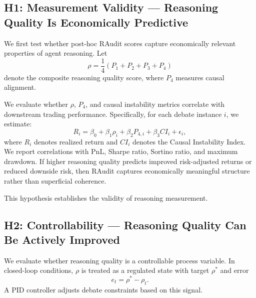 \documentclass{article}
\begin{document}
\subsection{H1: Measurement Validity — Reasoning Quality Is Economically Predictive}

We first test whether post-hoc RAudit scores capture economically relevant properties of agent reasoning. Let
\begin{equation}
\rho = \frac{1}{4}(P_1 + P_2 + P_3 + P_4)
\end{equation}
denote the composite reasoning quality score, where $P_4$ measures causal alignment.

We evaluate whether $\rho$, $P_4$, and causal instability metrics correlate with downstream trading performance. Specifically, for each debate instance $i$, we estimate:
\begin{equation}
R_i = \beta_0 + \beta_1 \rho_i + \beta_2 P_{4,i} + \beta_3 CI_i + \epsilon_i,
\end{equation}
where $R_i$ denotes realized return and $CI_i$ denotes the Causal Instability Index. We report correlations with PnL, Sharpe ratio, Sortino ratio, and maximum drawdown. If higher reasoning quality predicts improved risk-adjusted returns or reduced downside risk, then RAudit captures economically meaningful structure rather than superficial coherence.

This hypothesis establishes the validity of reasoning measurement.

\subsection{H2: Controllability — Reasoning Quality Can Be Actively Improved}

We evaluate whether reasoning quality is a controllable process variable. In closed-loop conditions, $\rho$ is treated as a regulated state with target $\rho^*$ and error
\begin{equation}
e_t = \rho^* - \rho_t.
\end{equation}
A PID controller adjusts debate constraints based on this signal.

\vspace{0.3em}
\end{document}
